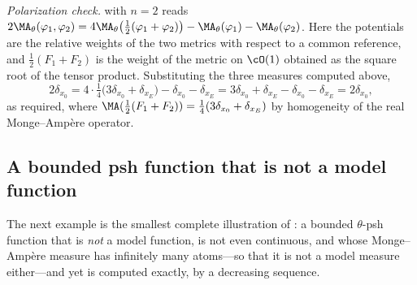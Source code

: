 \begin{example}
\emph{Polarization check.}   with \(n=2\) reads
\(2\MA_\theta(\varphi_1,\varphi_2)
 =4\MA_\theta\bigl(\tfrac12(\varphi_1+\varphi_2)\bigr)
  -\MA_\theta(\varphi_1)-\MA_\theta(\varphi_2)\).
Here the potentials are the relative weights of the two metrics with respect
to a common reference, and
\(\tfrac12(F_1+F_2)\) is the weight of the metric on \(\cO(1)\) obtained as
the square root of the tensor product.  Substituting the three measures
computed above,
\[
 2\delta_{x_0}
 =4\cdot\tfrac14\bigl(3\delta_{x_0}+\delta_{x_E}\bigr)
  -\delta_{x_0}-\delta_{x_E}
 =3\delta_{x_0}+\delta_{x_E}-\delta_{x_0}-\delta_{x_E}
 =2\delta_{x_0},
\]
as required, where
\(\MA(\tfrac12(F_1+F_2))=\tfrac14(3\delta_{x_0}+\delta_{x_E})\) by
homogeneity of the real Monge--Amp\`ere operator.
\end{example}

\subsection{A bounded psh function that is not a model function}
\label{sec:ch24-ex-branch}

The next example is the smallest complete illustration of
: a bounded \(\theta\)-psh function that is
\emph{not} a model function, is not even continuous, and whose
Monge--Amp\`ere measure has infinitely many atoms---so that it is not a model
measure either---and yet is computed exactly, by a decreasing sequence.

